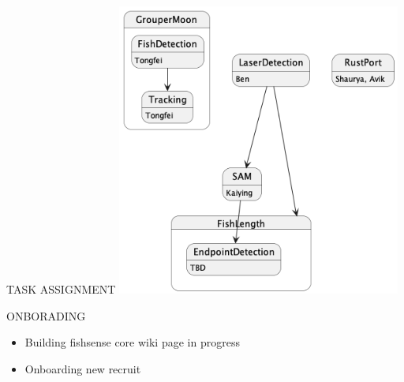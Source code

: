 
\begin{frame}{TASK ASSIGNMENT}
    \centering
      \includegraphics[height=0.7\textheight,width=0.7\textwidth,keepaspectratio]{images/CorePlans.png}
 \end{frame}




\begin{frame}{ONBORADING}
     \begin{itemize}
         \item Building fishsense core wiki page in progress
         \item Onboarding new recruit 
     \end{itemize}    
 \end{frame}


